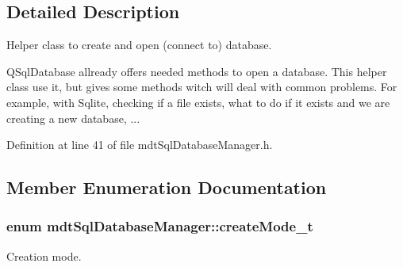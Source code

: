 \subsection{Detailed Description}
Helper class to create and open (connect to) database. 

QSqlDatabase allready offers needed methods to open a database. This helper class use it, but gives some methods witch will deal with common problems. For example, with Sqlite, checking if a file exists, what to do if it exists and we are creating a new database, ... 

Definition at line 41 of file mdtSqlDatabaseManager.h.



\subsection{Member Enumeration Documentation}
\hypertarget{classmdt_sql_database_manager_a2f5b46d67a88095053a5edfc415c7418}{
\subsubsection[{createMode\_\-t}]{\setlength{\rightskip}{0pt plus 5cm}enum {\bf mdtSqlDatabaseManager::createMode\_\-t}}}
\label{classmdt_sql_database_manager_a2f5b46d67a88095053a5edfc415c7418}


Creation mode. 

